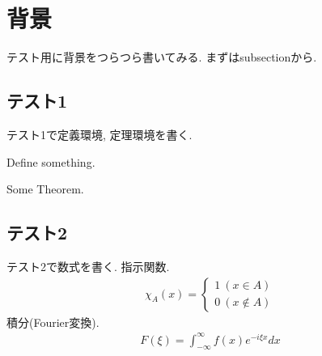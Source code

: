 \documentclass[../sample.tex]{subfiles}
\begin{document}
    \section{背景}
    テスト用に背景をつらつら書いてみる. まずはsubsectionから.
        \subsection{テスト1}
        テスト1で定義環境, 定理環境を書く.
            \begin{dfn}
                Define something.
            \end{dfn}
            \begin{thm}
                Some Theorem.
            \end{thm}
        \subsection{テスト2}
        テスト2で数式を書く. 指示関数.
            \begin{align*}
                \mathbb{\chi}_A(x)=
                \begin{cases}
                    1\ (x\in A) \\
                    0\ (x \notin A)
                \end{cases}
            \end{align*}
        積分(Fourier変換).
            \begin{align*}
                F(\xi)
                =
                \int_{-\infty}^{\infty}
                    f(x)e^{-i\xi x}dx
            \end{align*}
\end{document}
